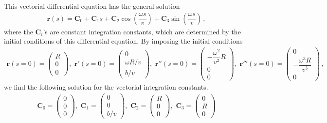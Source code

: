 \documentclass[11pt, DINA4, fleqn]{amsart}
\def\vr{\boldsymbol{r}\xspace}
\begin{document}
This vectorial differential equation has the general solution
\begin{align}
\vr(s) = \boldsymbol{C}_0 + \boldsymbol{C}_1 s
+ \boldsymbol{C}_2 \cos\left(\dfrac{\omega s}{v}\right)
+ \boldsymbol{C}_3 \sin\left(\dfrac{\omega s}{v}\right) \, ,
\end{align}
where the $\boldsymbol{C}_i$'s are constant integration constants, which are determined by the initial conditions of this differential equation.
By imposing the initial conditions
\begin{align}
\vr(s=0) = 
\begin{pmatrix}R \\ 0 \\ 0
\end{pmatrix}, \,\,
\vr'(s=0) = 
\begin{pmatrix}0 \\ \omega R/v \\ b/v
\end{pmatrix}, \,\,
\vr''(s=0) =
\begin{pmatrix}
-\dfrac{\omega^2}{v^2} R \\ 0 \\ 0
\end{pmatrix}, \,\,
\vr'''(s=0) =
\begin{pmatrix}
0 \\ -\dfrac{\omega^3 R}{v^3} \\ 0
\end{pmatrix} \, ,
\end{align}
we find the following solution for the vectorial integration constants.
\begin{align}
\boldsymbol{C}_0 = 
\begin{pmatrix}0 \\ 0 \\ 0
\end{pmatrix}, \,\,
\boldsymbol{C}_1 = 
\begin{pmatrix}0 \\ 0 \\ b/v
\end{pmatrix}, \,\,
\boldsymbol{C}_2 =
\begin{pmatrix}
R \\ 0 \\ 0
\end{pmatrix}, \,\,
\boldsymbol{C}_3 =
\begin{pmatrix}
0 \\ R \\ 0
\end{pmatrix}
\end{align}
\end{document}
